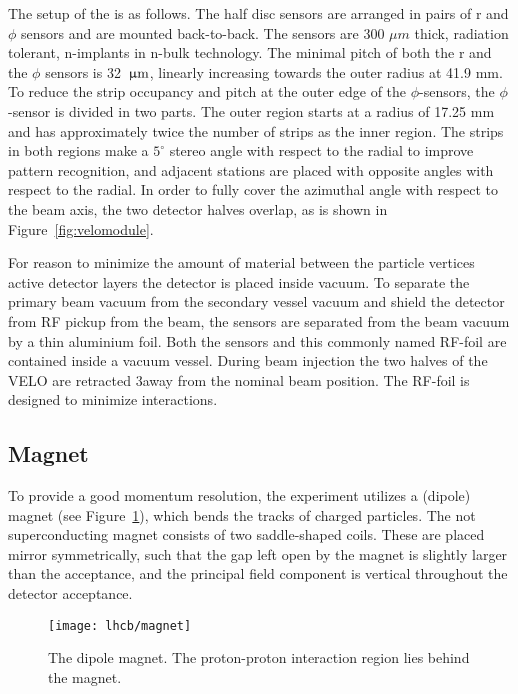



The setup of the \velo is as follows. The half disc sensors are arranged in
pairs of r and $\phi$ sensors and are mounted back-to-back. The sensors are 300
$\mu m$ thick, radiation tolerant, n-implants in n-bulk technology. The
minimal pitch of both the r and the $\phi$ sensors is 32 ${\,\upmu\rm m}$, linearly
increasing towards the outer radius at 41.9 mm. To reduce the strip occupancy
and pitch at the outer edge of the $\phi$-sensors, the $\phi$-sensor is divided
in two parts. The outer region starts at a radius of 17.25 mm and has
approximately twice the number of strips as the inner region. The strips in
both regions make a $5^\circ$ stereo angle with respect to the radial to
improve pattern recognition, and adjacent stations are placed with opposite
angles with respect to the radial. In order to fully cover the azimuthal angle
with respect to the beam axis, the two detector halves overlap, as is shown in
Figure~\ref{fig:velomodule}.

For reason to minimize the amount of material between the particle vertices
active detector layers the detector is placed inside vacuum. To separate the
primary beam vacuum from the secondary vessel vacuum and shield the detector
from RF pickup from the beam, the sensors are separated from the beam vacuum by
a thin aluminium foil. Both the sensors and this commonly named RF-foil are
contained inside a vacuum vessel. During beam injection the two halves of the
VELO are retracted 3\cm away from the nominal beam position. The RF-foil is
designed to minimize interactions.

\subsection{Magnet}

To provide a good momentum resolution, the \lhcb experiment utilizes a (dipole)
magnet (see Figure~\ref{fig:magnet}), which bends the tracks of charged
particles. The not superconducting magnet consists of two saddle-shaped coils.
These are placed mirror symmetrically, such that the gap left open by the
magnet is slightly larger than the \lhcb acceptance, and the principal field
component is vertical throughout the detector acceptance.

\begin{figure}[tb]
\begin{center}
\texttt{[image: lhcb/magnet]}
\end{center}
\caption{\small The \lhcb dipole magnet. The proton-proton interaction
region lies behind the magnet.}
\label{fig:magnet}
\end{figure}


